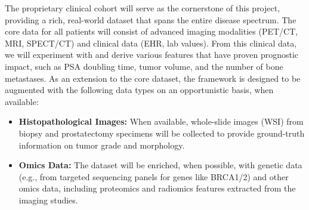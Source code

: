 \documentclass[11pt, a4paper]{article}
\begin{document}
The proprietary clinical cohort will serve as the cornerstone of this project, providing a rich, real-world dataset that spans the entire disease spectrum. The core data for all patients will consist of advanced imaging modalities (PET/CT, MRI, SPECT/CT) and clinical data (EHR, lab values). From this clinical data, we will experiment with and derive various features that have proven prognostic impact, such as PSA doubling time, tumor volume, and the number of bone metastases. As an extension to the core dataset, the framework is designed to be augmented with the following data types on an opportunistic basis, when available:
\begin{itemize}
    \item \textbf{Histopathological Images:} When available, whole-slide images (WSI) from biopsy and prostatectomy specimens will be collected to provide ground-truth information on tumor grade and morphology.
    \item \textbf{Omics Data:} The dataset will be enriched, when possible, with genetic data (e.g., from targeted sequencing panels for genes like BRCA1/2) and other omics data, including proteomics and radiomics features extracted from the imaging studies.
\end{itemize}
\end{document}
